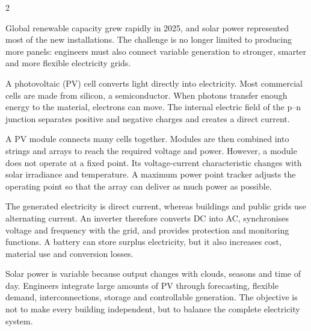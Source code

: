 

\begin{multicols}{2}

\begin{engineeringnews}
Global renewable capacity grew rapidly in 2025, and solar power represented most of the new installations. The challenge is no longer limited to producing more panels: engineers must also connect variable generation to stronger, smarter and more flexible electricity grids.
\end{engineeringnews}

\begin{ecarticle}
A photovoltaic (PV) cell converts light directly into electricity. Most commercial cells are made from silicon, a semiconductor. When photons transfer enough energy to the material, electrons can move. The internal electric field of the p--n junction separates positive and negative charges and creates a direct current.

A PV module connects many cells together. Modules are then combined into strings and arrays to reach the required voltage and power. However, a module does not operate at a fixed point. Its voltage-current characteristic changes with solar irradiance and temperature. A maximum power point tracker adjusts the operating point so that the array can deliver as much power as possible.

The generated electricity is direct current, whereas buildings and public grids use alternating current. An inverter therefore converts DC into AC, synchronises voltage and frequency with the grid, and provides protection and monitoring functions. A battery can store surplus electricity, but it also increases cost, material use and conversion losses.

Solar power is variable because output changes with clouds, seasons and time of day. Engineers integrate large amounts of PV through forecasting, flexible demand, interconnections, storage and controllable generation. The objective is not to make every building independent, but to balance the complete electricity system.


\end{ecarticle}
\end{multicols}
